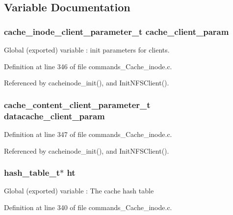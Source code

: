 \subsection{Variable Documentation}
\subsubsection{\setlength{\rightskip}{0pt plus 5cm}cache\_\-inode\_\-client\_\-parameter\_\-t {\bf cache\_\-client\_\-param}}\label{commands__Cache__inode_8c_a12}


Global (exported) variable : init parameters for clients. 

Definition at line 346 of file commands\_\-Cache\_\-inode.c.

Referenced by cacheinode\_\-init(), and Init\-NFSClient().
\subsubsection{\setlength{\rightskip}{0pt plus 5cm}cache\_\-content\_\-client\_\-parameter\_\-t {\bf datacache\_\-client\_\-param}}\label{commands__Cache__inode_8c_a13}




Definition at line 347 of file commands\_\-Cache\_\-inode.c.

Referenced by cacheinode\_\-init(), and Init\-NFSClient().
\subsubsection{\setlength{\rightskip}{0pt plus 5cm}hash\_\-table\_\-t$\ast$ {\bf ht}}\label{commands__Cache__inode_8c_a10}


Global (exported) variable : The cache hash table 

Definition at line 340 of file commands\_\-Cache\_\-inode.c.


